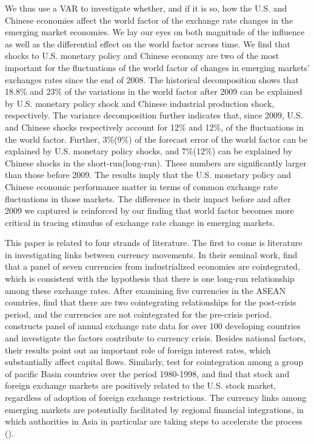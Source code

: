 \documentclass[12pt]{article}
\numberwithin{equation}{section}
\begin{document}
We thus use a VAR to investigate whether, and if it is so, how the U.S. and Chinese economies affect the world factor of the exchange rate changes in the emerging market economies. We lay our eyes on both magnitude of the influence as well as the differential effect on the world factor across time. We find that shocks to U.S. monetary policy and Chinese economy are two of the most important for the fluctuations of the world factor of changes in emerging markets' exchanges rates since the end of 2008. The historical decomposition shows that 18.8\% and 23\% of the variations in the world factor after 2009 can be explained by U.S. monetary policy shock and Chinese industrial production shock, respectively. The variance decomposition further indicates that, since 2009, U.S. and Chinese shocks respectively account for 12\% and 12\%, of the fluctuations in the world factor. Further, 3\%(9\%) of the forecast error of the world factor can be explained by U.S. monetary policy shocks, and 7\%(12\%) can be explained by Chinese shocks in the short-run(long-run). These numbers are significantly larger than those before 2009. The results imply that the U.S. monetary policy and Chinese economic performance matter in terms of common exchange rate fluctuations in those markets. The difference in their impact before and after 2009 we captured is reinforced by our finding that world factor becomes more critical in tracing stimulus of exchange rate change in emerging markets.

This paper is related to four strands of literature. The first to come is literature in investigating links between currency movements. In their seminal work, \cite{BaillieBollerslev1989} find that a panel of seven currencies from industrialized economies are cointegrated, which is consistent with the hypothesis that there is one long-run relationship among these exchange rates. After examining five currencies in the ASEAN countries, \cite{LeeAzali2010} find that there are two cointegrating relationships for the post-crisis period, and the currencies are not cointegrated for the pre-crisis period. \cite{FrankelRose1996} constructs panel of annual exchange rate data for over 100 developing countries and investigate the factors contribute to currency crisis. Besides national factors, their results point out an important role of foreign interest rates, which substantially affect capital flows. Similarly, \cite{PR2005} test for cointegration among a group of pacific Basin countries over the period 1980-1998, and find that stock and foreign exchange markets are positively related to the U.S. stock market, regardless of adoption of foreign exchange restrictions. The currency links among emerging markets are potentially facilitated by regional financial integrations, in which authorities in Asia in particular are taking steps to accelerate the process (\cite{GCH2007}).
\end{document}
